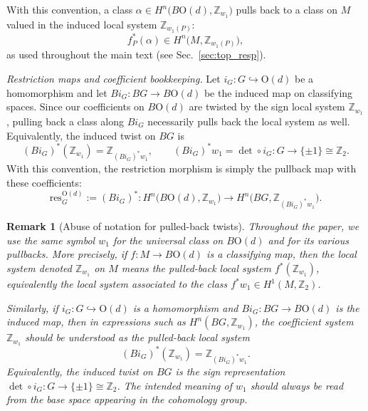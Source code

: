 \documentclass[aps,prx,reprint,superscriptaddress,twocolumn,amsmath,amssymb,amsfonts, nofootinbib]{revtex4-2}
\newcommand{\res}{\text{res}}
\newcommand{\Z}{\mathbb{Z}}
\theoremstyle{apsstyle}
\newtheorem{remark}[theorem]{Remark}
\begin{document}
\medskip

\noindent With this convention, a class $\alpha\in H^{n}\big(B\mathrm{O}(d),\Z_{w_{1}}\big)$ pulls back to a class on $M$ valued in the induced local system $\Z_{w_{1}(P)}$:
\begin{equation}
\label{eq:pullback_class}
    f_{P}^{*}(\alpha)\in H^{n}\big(M,\Z_{w_{1}(P)}\big),
\end{equation}
as used throughout the main text (see Sec.~\ref{sec:top_resp}).

\bigskip

\noindent \textit{Restriction maps and coefficient bookkeeping.}
Let $i_{G}:G\hookrightarrow \mathrm{O}(d)$ be a homomorphism and let $Bi_{G}:BG\to B\mathrm{O}(d)$ be the induced map on classifying spaces. Since our coefficients on $B\mathrm{O}(d)$ are twisted by the sign local system $\Z_{w_{1}}$, pulling back a class along $Bi_{G}$ necessarily pulls back the local system as well. Equivalently, the induced twist on $BG$ is
\begin{equation*}
    (Bi_{G})^*(\Z_{w_1})=\Z_{(Bi_{G})^*w_1}, \qquad 
    (Bi_{G})^*w_1=\det\circ i_{G}:G\to\{\pm1\}\cong\Z_2.
\end{equation*}
With this convention, the restriction morphism is simply the pullback map with these coefficients:
\begin{equation}
\label{eq:restriction_twisted}
    \res^{\mathrm{O}(d)}_{G}:=(Bi_{G})^{*}:
    H^{n}\big(B\mathrm{O}(d),\Z_{w_{1}}\big)
    \longrightarrow
    H^{n}\big(BG,\Z_{(Bi_{G})^{*}w_{1}}\big).
\end{equation}

\bigskip 



\begin{remark}[Abuse of notation for pulled-back twists]
\label{rem:abuse_pulledback_twists}
Throughout the paper, we use the same symbol $w_1$ for the universal class on $B\mathrm{O}(d)$ and for its various pullbacks. More precisely, if $f:M\to B\mathrm{O}(d)$ is a classifying map, then the local system denoted $\Z_{w_1}$ on $M$ means the pulled-back local system $f^*(\Z_{w_1})$, equivalently the local system associated to the class $f^*w_1\in H^1(M,\Z_2)$.

\bigskip 

\noindent Similarly, if $i_{G}:G\hookrightarrow \mathrm{O}(d)$ is a homomorphism and $Bi_{G}:BG\to B\mathrm{O}(d)$ is the induced map, then in expressions such as $ H^n(BG,\Z_{w_1})$, the coefficient system $\Z_{w_1}$ should be understood as the pulled-back local system
\begin{equation}
(Bi_{G})^*(\Z_{w_1})=\Z_{(Bi_{G})^*w_1}.
\end{equation}
Equivalently, the induced twist on $BG$ is the sign representation $\det\circ i_{G}:G\to\{\pm1\}\cong \Z_2$. The intended meaning of $w_1$ should always be read from the base space appearing in the cohomology group.
\end{remark}
\end{document}
